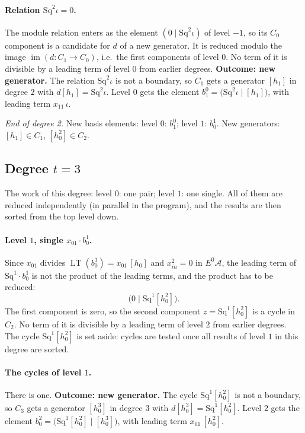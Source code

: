 \documentclass[11pt]{article}
\newcommand{\Sq}{\mathrm{Sq}}
\newcommand{\A}{\mathcal{A}}
\DeclareMathOperator{\LT}{LT}
\begin{document}
\paragraph{Relation $\Sq^{2}\iota = 0$.} The module relation enters as the element $(0 \mid \Sq^{2}\iota)$ of level $-1$, so its $C_0$ component is a candidate for $d$ of a new generator. It is reduced modulo the image $\operatorname{im}(d\colon C_1\to C_0)$, i.e.\ the first components of level $0$.
No term of it is divisible by a leading term of level $0$ from earlier degrees.
\textbf{Outcome: new generator.} The relation $\Sq^{2}\iota$ is not a boundary, so $C_{1}$ gets a generator $[h_1]$ in degree $2$ with $d[h_1] = \Sq^{2}\iota$.
Level $0$ gets the element $b^{0}_{1} = \bigl(\Sq^{2}\iota \;\big|\; [h_1]\bigr)$, with leading term $x_{11}\,\iota$.
\medskip
\par\noindent\emph{End of degree 2.} New basis elements: level $0$: $b^{0}_{1}$; level $1$: $b^{1}_{0}$. New generators: $[h_1]\in C_{1}$, $[h_0^2]\in C_{2}$.
\subsection*{Degree $t = 3$}
\noindent The work of this degree: level $0$: one pair; level $1$: one single. All of them are reduced independently (in parallel in the program), and the results are then sorted from the top level down.
\medskip
\paragraph{Level $1$, single $x_{01}\cdot b^{1}_{0}$.} Since $x_{01}$ divides $\LT(b^{1}_{0}) = x_{01}\,[h_0]$ and $x_{in}^2 = 0$ in $E^0\A$, the leading term of $\Sq^{1}\cdot b^{1}_{0}$ is not the product of the leading terms, and the product has to be reduced:
\[\bigl(0 \;\big|\; \Sq^{1}[h_0^2]\bigr).\]
The first component is zero, so the second component $z = \Sq^{1}[h_0^2]$ is a cycle in $C_{2}$.
No term of it is divisible by a leading term of level $2$ from earlier degrees.
The cycle $\Sq^{1}[h_0^2]$ is set aside: cycles are tested once all results of level $1$ in this degree are sorted.
\medskip
\paragraph{The cycles of level $1$.} There is one.
\textbf{Outcome: new generator.} The cycle $\Sq^{1}[h_0^2]$ is not a boundary, so $C_{3}$ gets a generator $[h_0^3]$ in degree $3$ with $d[h_0^3] = \Sq^{1}[h_0^2]$.
Level $2$ gets the element $b^{2}_{0} = \bigl(\Sq^{1}[h_0^2] \;\big|\; [h_0^3]\bigr)$, with leading term $x_{01}\,[h_0^2]$.
\medskip
\end{document}
